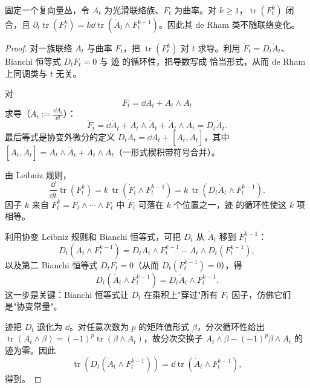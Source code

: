 \begin{theorem}
固定一个复向量丛，令 $A_t$ 为光滑联络族、$F_t$ 为曲率。对 $k\ge1$，$\operatorname{tr}(F_t^k)$ 闭合，且 $\partial_t\operatorname{tr}(F_t^k)=k\dd\operatorname{tr}(\dot A_t\wedge F_t^{k-1})$。因此其 de Rham 类不随联络变化。
\end{theorem}
\begin{proof}
对一族联络 $A_t$ 与曲率 $F_t$，把 $\operatorname{tr}(F_t^k)$ 对 $t$ 求导。利用 $\dot F_t=D_t\dot A_t$、Bianchi 恒等式 $D_tF_t=0$ 与 迹 的循环性，把导数写成 恰当形式，从而 de Rham 上同调类与 $t$ 无关。

对
\begin{equation*}
F_t=\dd A_t+A_t\wedge A_t
\end{equation*}
求导（$\dot A_t:=\frac{\dd A_t}{\dd t}$）：
\begin{equation*}
\dot F_t
=\dd\dot A_t+A_t\wedge\dot A_t+
\dot A_t\wedge A_t
=D_t\dot A_t.
\end{equation*}
最后等式是协变外微分的定义 $D_t\dot A_t=\dd\dot A_t+[A_t,\dot A_t]$，其中 $[A_t,\dot A_t]=A_t\wedge\dot A_t+\dot A_t\wedge A_t$（一形式楔积带符号合并）。

由 Leibniz 规则，
\begin{equation*}
\frac{\dd}{\dd t}\operatorname{tr}(F_t^k)
=k\,\operatorname{tr}(\dot F_t\wedge F_t^{k-1})
=k\,\operatorname{tr}(D_t\dot A_t\wedge F_t^{k-1}).
\end{equation*}
因子 $k$ 来自 $F_t^k=F_t\wedge\cdots\wedge F_t$ 中 $\dot F_t$ 可落在 $k$ 个位置之一，迹 的循环性使这 $k$ 项相等。

利用协变 Leibniz 规则和 Bianchi 恒等式，可把 $D_t$ 从 $\dot A_t$ 移到 $F_t^{k-1}$：
\begin{equation*}
D_t(\dot A_t\wedge F_t^{k-1})
=D_t\dot A_t\wedge F_t^{k-1}
-\dot A_t\wedge D_t(F_t^{k-1}),
\end{equation*}
以及第二 Bianchi 恒等式 $D_tF_t=0$（从而 $D_t(F_t^{k-1})=0$），得
\begin{equation*}
D_t(\dot A_t\wedge F_t^{k-1})
=D_t\dot A_t\wedge F_t^{k-1}.
\end{equation*}
这一步是关键：Bianchi 恒等式让 $D_t$ 在乘积上"穿过"所有 $F_t$ 因子，仿佛它们是"协变常量"。

迹把 $D_t$ 退化为 $\dd$。对任意次数为 $p$ 的矩阵值形式 $\beta$，分次循环性给出 $\operatorname{tr}(A_t\wedge\beta)=(-1)^p\operatorname{tr}(\beta\wedge A_t)$，故分次交换子 $A_t\wedge\beta-(-1)^p\beta\wedge A_t$ 的迹为零。因此
\begin{equation*}
\operatorname{tr}(D_t(\dot A_t\wedge F_t^{k-1}))
=\dd\operatorname{tr}(\dot A_t\wedge F_t^{k-1}),
\end{equation*}
得到。


\end{proof}
